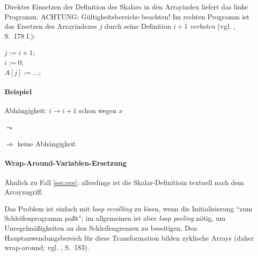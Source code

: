 Direktes Einsetzen der Definition des Skalars in den Arrayindex liefert
das linke Programm. ACHTUNG: Gültigkeitsbereiche beachten! Im rechten
Programm ist das Ersetzen des Arrayindexes $j$ durch seine Definition
$i+1$ \emph{verboten} (vgl. \cite{Zima90}, S.~178 f.):\\[1cm]
\begin{minipage}{.4\textwidth}
    \begin{algorithm}[H]
    \end{algorithm}
\end{minipage}
\begin{minipage}{.4\textwidth}
    \begin{algorithm}[H]
    $j := i+1$;\\
    $i := 0$;\\
    $A[j] := ...$;\\
    \end{algorithm}
\end{minipage}

\paragraph{Beispiel}

\begin{procedure}[H]
\SetAlgoLined
{}
\end{procedure}
Abhängigkeit: $i \rightarrow i+1$ schon wegen $x$

$\leadsto$

\begin{procedure}[H]
\SetAlgoLined
{}
\end{procedure}

$\Rightarrow$ keine Abhängigkeit
\newpage
\paragraph{Wrap-Around-Variablen-Ersetzung}
\label{sec:wave}

Ähnlich zu Fall \ref{sec:sve}; allerdings ist die Skalar-Definitioin
textuell nach dem Arrayzugriff.

Das Problem ist einfach mit \emph{loop rerolling} zu lösen, wenn die
Initialisierung ``zum Schleifenprogramm paßt''; im allgemeinen ist aber
\emph{loop peeling} nötig, um Unregelmäßigkeiten an den Schleifengrenzen
zu beseitigen. Den Hauptanwendungsbereich für diese Transformation
bilden zyklische Arrays (daher wrap-around; vgl. \cite{Zima90}, S.~183).

